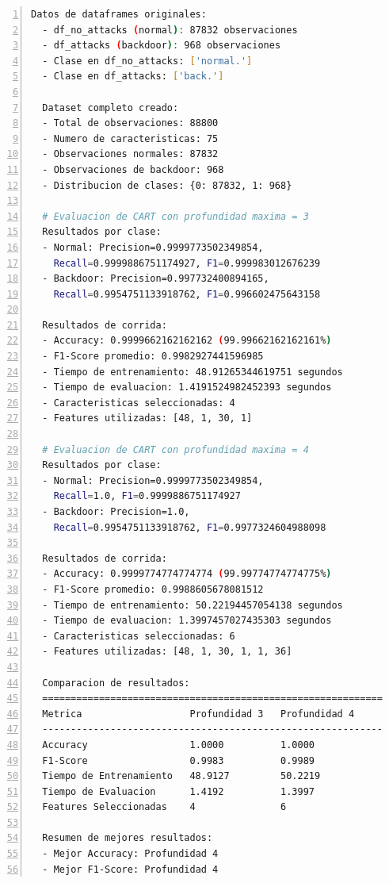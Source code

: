 \documentclass[12pt,a4paper]{article}
\begin{document}
    \begin{lstlisting}[language=bash, numbers=left, basicstyle=\ttfamily\small,label={lst:lstlisting6}]
  Datos de dataframes originales:
  - df_no_attacks (normal): 87832 observaciones
  - df_attacks (backdoor): 968 observaciones
  - Clase en df_no_attacks: ['normal.']
  - Clase en df_attacks: ['back.']

  Dataset completo creado:
  - Total de observaciones: 88800
  - Numero de caracteristicas: 75
  - Observaciones normales: 87832
  - Observaciones de backdoor: 968
  - Distribucion de clases: {0: 87832, 1: 968}

  # Evaluacion de CART con profundidad maxima = 3
  Resultados por clase:
  - Normal: Precision=0.9999773502349854,
    Recall=0.9999886751174927, F1=0.999983012676239
  - Backdoor: Precision=0.997732400894165,
    Recall=0.9954751133918762, F1=0.996602475643158

  Resultados de corrida:
  - Accuracy: 0.9999662162162162 (99.99662162162161%)
  - F1-Score promedio: 0.9982927441596985
  - Tiempo de entrenamiento: 48.91265344619751 segundos
  - Tiempo de evaluacion: 1.4191524982452393 segundos
  - Caracteristicas seleccionadas: 4
  - Features utilizadas: [48, 1, 30, 1]

  # Evaluacion de CART con profundidad maxima = 4
  Resultados por clase:
  - Normal: Precision=0.9999773502349854,
    Recall=1.0, F1=0.9999886751174927
  - Backdoor: Precision=1.0,
    Recall=0.9954751133918762, F1=0.9977324604988098

  Resultados de corrida:
  - Accuracy: 0.9999774774774774 (99.99774774774775%)
  - F1-Score promedio: 0.9988605678081512
  - Tiempo de entrenamiento: 50.22194457054138 segundos
  - Tiempo de evaluacion: 1.3997457027435303 segundos
  - Caracteristicas seleccionadas: 6
  - Features utilizadas: [48, 1, 30, 1, 1, 36]

  Comparacion de resultados:
  ============================================================
  Metrica                   Profundidad 3   Profundidad 4
  ------------------------------------------------------------
  Accuracy                  1.0000          1.0000
  F1-Score                  0.9983          0.9989
  Tiempo de Entrenamiento   48.9127         50.2219
  Tiempo de Evaluacion      1.4192          1.3997
  Features Seleccionadas    4               6

  Resumen de mejores resultados:
  - Mejor Accuracy: Profundidad 4
  - Mejor F1-Score: Profundidad 4
    \end{lstlisting}
\end{document}
